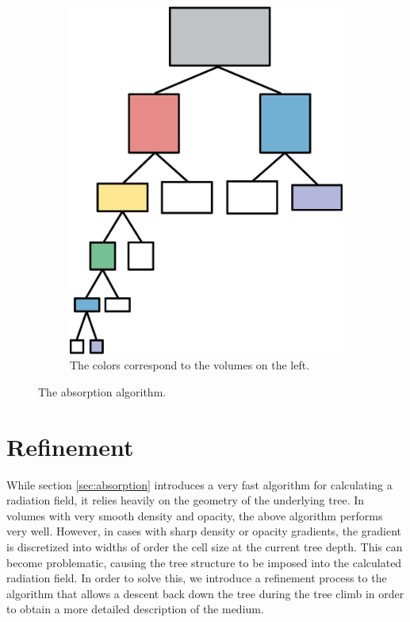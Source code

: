 \begin{figure}
\begin{subfigure}[b]{0.45\textwidth}
                \includegraphics[width=\textwidth]{graphics/RT_tree.eps}
                \caption{The colors correspond to the volumes on the left.}
                \label{fig:absorptiontree}
        \end{subfigure}
        \caption[The absorption algorithm.]{The absorption algorithm.}
        \label{fig:absorption}
\end{figure}



\section{Refinement}
\label{sec:refinement}

While section \ref{sec:absorption} introduces a very fast algorithm for calculating a radiation field, it relies heavily on the geometry of the underlying tree. In volumes with very smooth density and opacity, the above algorithm performs very well. However, in cases with sharp density or opacity gradients, the gradient is discretized into widths of order the cell size at the current tree depth. This can become problematic, causing the tree structure to be imposed into the calculated radiation field. In order to solve this, we introduce a refinement process to the algorithm that allows a descent back down the tree during the tree climb in order to obtain a more detailed description of the medium.

